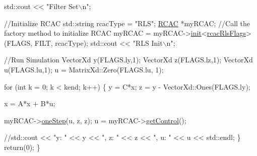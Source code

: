 \begin{DoxyCode}
    std::cout << \textcolor{stringliteral}{"Filter Set\(\backslash\)n"}; 

    \textcolor{comment}{//Initialize RCAC}
    std::string rcacType = \textcolor{stringliteral}{"RLS"};
    \hyperlink{class_r_c_a_c}{RCAC} *myRCAC;
    \textcolor{comment}{//Call the factory method to initialize RCAC}
    myRCAC = myRCAC->\hyperlink{class_r_c_a_c_af7b7133b676886d5010be725291c1a1d}{init}<\hyperlink{structrcac_rls_flags}{rcacRlsFlags}>(FLAGS, FILT, rcacType);
    std::cout << \textcolor{stringliteral}{"RLS Init\(\backslash\)n"}; 

    \textcolor{comment}{//Run Simulation}
    VectorXd y(FLAGS.ly,1);
    VectorXd z(FLAGS.lz,1);
    VectorXd u(FLAGS.lu,1);
    u = MatrixXd::Zero(FLAGS.lu, 1);

    \textcolor{keywordflow}{for} (\textcolor{keywordtype}{int} k = 0; k < kend; k++)
    \{
        y = C*x;
        z = y - VectorXd::Ones(FLAGS.ly);

        x = A*x + B*u;        

        myRCAC->\hyperlink{class_r_c_a_c_a956bb6a557f050d3808d5392fd3add20}{oneStep}(u, z, z);
        u = myRCAC->\hyperlink{class_r_c_a_c_ad93e5753d1810d7c3b2f6fbf56857a51}{getControl}();

        \textcolor{comment}{//std::cout << "y: " << y << ", z: " << z << ", u: " << u << std::endl;}
    \}
    \textcolor{keywordflow}{return}(0);
\}
\end{DoxyCode}
 